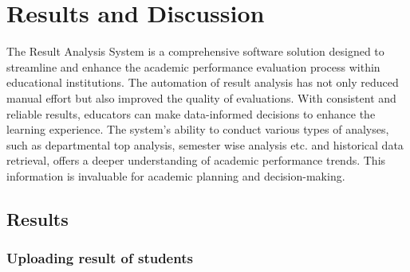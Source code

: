 \documentclass{nascproject}
\begin{document}
\chapter{Results and Discussion}
The Result Analysis System is a comprehensive software solution designed to streamline and enhance the academic performance evaluation process within educational institutions. The automation of result analysis has not only reduced manual effort but also improved the quality of evaluations. With consistent and reliable results, educators can make data-informed decisions to enhance the learning experience. The system's ability to conduct various types of analyses, such as departmental top analysis, semester wise analysis etc. and historical data retrieval, offers a deeper understanding of academic performance trends. This information is invaluable for academic planning and decision-making.
\section{Results}
\subsection{Uploading result of students}
\end{document}
